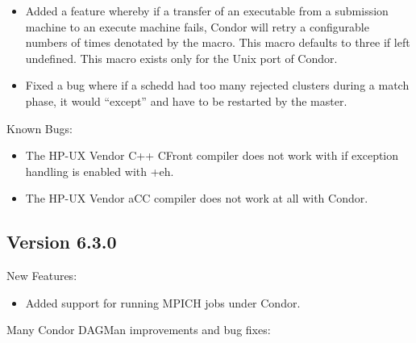 \begin{itemize}
\item Added a feature whereby if a transfer of an executable
from a submission machine to an execute machine fails, Condor
will retry a configurable numbers of times denotated by the
 macro. This macro defaults to three if
left undefined. This macro exists only for the Unix port of Condor.

\item Fixed a bug where if a schedd had too many rejected clusters during a
match phase, it would ``except'' and have to be restarted by the master.

\end{itemize}

\noindent Known Bugs:
\begin{itemize}
\item The HP-UX Vendor C++ CFront compiler does not work with 
if exception handling is enabled with +eh.

\item The HP-UX Vendor aCC compiler does not work at all with Condor.
\end{itemize}

\subsection{\label{sec:New-6-3-0}Version 6.3.0}

\noindent New Features:
\begin{itemize}

\item Added support for running MPICH jobs under Condor.

\end{itemize}

\noindent
Many Condor DAGMan improvements and bug fixes:


